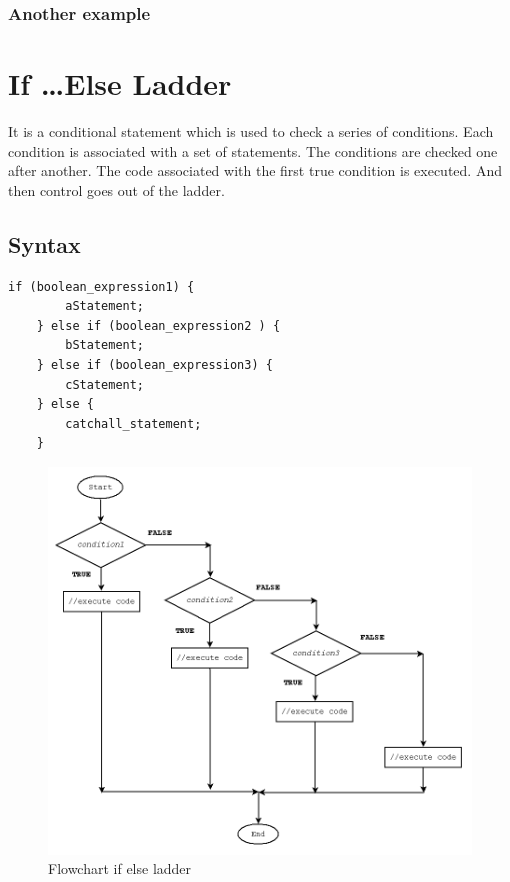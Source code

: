 \documentclass[11pt,a4paper]{article}
\begin{document}
\subsubsection*{Another example}


\section*{If \ldots Else Ladder}
It is a conditional statement which is used to check a series of conditions. Each condition is associated with a set of statements. The conditions are checked one after another. The code associated with the first true condition is executed. And then control goes out of the ladder.

\subsection*{Syntax} 
\begin{lstlisting}[numbers=none]
    if (boolean_expression1) {
        aStatement;
    } else if (boolean_expression2 ) {
        bStatement;
    } else if (boolean_expression3) {
        cStatement;   
    } else {
        catchall_statement;
    }
\end{lstlisting}

\begin{figure}[ht]

\begin{center}
\includegraphics[scale=0.4]{flowchart_if-else-if-statement.png}
\caption{Flowchart if else ladder}
\label{Flowchart:ifelseladder}
\end{center}
\end{figure}
\end{document}

